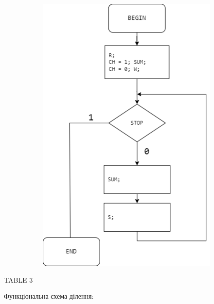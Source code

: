 \documentclass[12pt,a4paper]{article}
\begin{document}
\begin{figure}[h!]
\begin{subfigure}[t]{0.45\textwidth}
            \includegraphics[width=\linewidth]{FS_div_alg.png}
        \end{subfigure}
    
        \label{fig:microalg3}

    \end{figure}

    \newpage

    TABLE 3

    \newpage

    Функціональна схема ділення:
\end{document}
